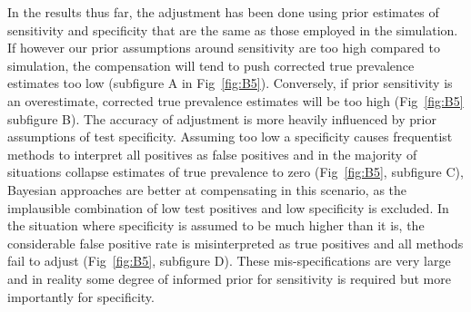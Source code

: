 \documentclass[a4paper, 12pt, twoside]{article}
\begin{document}
In the results thus far, the adjustment has been done using prior estimates of sensitivity and specificity that are the same as those employed in the simulation. If however our prior assumptions around sensitivity are too high compared to simulation, the compensation will tend to push corrected true prevalence estimates too low (subfigure A in Fig~\ref{fig:B5}). Conversely, if prior sensitivity is an overestimate, corrected true prevalence estimates will be too high (Fig~\ref{fig:B5} subfigure B). The accuracy of adjustment is more heavily influenced by prior assumptions of test specificity. Assuming too low a specificity causes frequentist methods to interpret all positives as false positives and in the majority of situations collapse estimates of true prevalence to zero (Fig~\ref{fig:B5}, subfigure C), Bayesian approaches are better at compensating in this scenario, as the implausible combination of low test positives and low specificity is excluded. In the situation where specificity is assumed to be much higher than it is, the considerable false positive rate is misinterpreted as true positives and all methods fail to adjust (Fig~\ref{fig:B5}, subfigure D). These mis-specifications are very large and in reality some degree of informed prior for sensitivity is required but more importantly for specificity.
\end{document}
